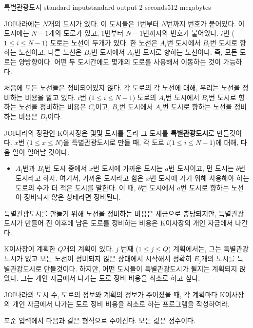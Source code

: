 \begin{problem}{특별관광도시}
	{standard input}{standard output}
	{2 seconds}{512 megabytes}{}
	
	JOI나라에는 $N$개의 도시가 있다. 이 도시들은 1번부터 $N$번까지 번호가 붙어있다. 이 도시에는 $N-1$개의 도로가 있고, 1번부터 $N-1$번까지의 번호가 붙어있다. $i$번 ($1 \le i \le N-1$) 도로는 노선이 두개가 있다. 한 노선은 $A_i$번 도시에서 $B_i$번 도시로 향하는 노선이고, 다른 노선은 $B_i$번 도시에서 $A_i$번 도시로 향하는 노선이다. 즉, 모든 도로는 양방향이다. 어떤 두 도시간에도 몇개의 도로를 사용해서 이동하는 것이 가능하다.
	
	처음에 모든 노선들은 정비되어있지 않다. 각 도로의 각 노선에 대해, 우리는 노선을 정비하는 비용을 알고 있다. $i$번 ($1 \le i \le N-1$) 도로의 $A_i$번 도시에서 $B_i$번 도시로 향하는 노선을 정비하는 비용은 $C_i$이고, $B_i$번 도시에서 $A_i$번 도시로 향하는 노선을 정비하는 비용은 $D_i$이다.
	
	JOI나라의 장관인 K이사장은 몇몇 도시를 돌라 그 도시를 \textbf{특별관광도시}로 만들것이다. $x$번 ($1 \le x \le N$)을 특별관광도시로 만들 때, 각 도로 $i$($1 \le i \le N-1$)에 대해, 다음 일이 일어날 것이다.
	
	\begin{itemize}
		\item[] $A_i$번과 $B_i$번 도시 중에서 $x$번 도시에 가까운 도시는 $a$번 도시이고, 먼 도시는 $b$번 도시라고 하자. 여기서, 가까운 도시라고 함은 $x$번 도시에 가기 위해 사용해야 하는 도로의 수가 더 적은 도시를 말한다. 이 때, $b$번 도시에서 $a$번 도시로 향하는 노선이 정비되지 않은 상태라면 정비된다.
	\end{itemize}
	
	특별관광도시를 만들기 위해 노선을 정비하는 비용은 세금으로 충당되지만, 특별관광도시가 만들어 진 이후에 남은 도로를 정비하는 비용은 K이사장의 개인 자금에서 나간다.
	
	K이사장이 계획한 $Q$개의 계획이 있다. $j$ 번째 ($1 \le j \le Q$) 계획에서는, 그는 특별관광도시가 없고 모든 노선이 정비되지 않은 상태에서 시작해서 정확히 $E_j$개의 도시를 특별관광도시로 만들것이다. 하지만, 어떤 도시들이 특별관광도시가 될지는 계획되지 않았다. 그는 개인 자금에서 나가는 도로 정비 비용을 최소로 하고 싶다.
	
	JOI나라의 도시 수, 도로의 정보와 계획의 정보가 주어졌을 때, 각 계획마다 K이사장의 개인 자금에서 나가는 도로 정비 비용을 최소로 하는 프로그램을 작성하여라.
	
	\InputFile
	
	표준 입력에서 다음과 같은 형식으로 주어진다. 모든 값은 정수이다.


\end{problem}
